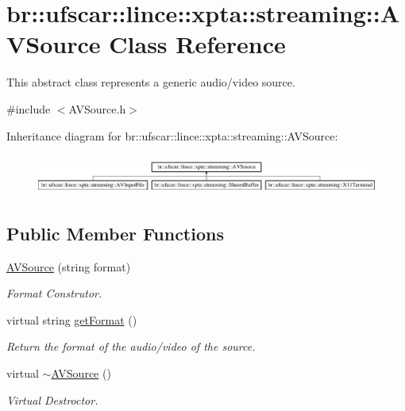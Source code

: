 \hypertarget{classbr_1_1ufscar_1_1lince_1_1xpta_1_1streaming_1_1AVSource}{
\section{br::ufscar::lince::xpta::streaming::AVSource Class Reference}
\label{classbr_1_1ufscar_1_1lince_1_1xpta_1_1streaming_1_1AVSource}
}


This abstract class represents a generic audio/video source.  




{\ttfamily \#include $<$AVSource.h$>$}

Inheritance diagram for br::ufscar::lince::xpta::streaming::AVSource:\begin{figure}[H]
\begin{center}
\leavevmode
\includegraphics[height=1.34293cm]{classbr_1_1ufscar_1_1lince_1_1xpta_1_1streaming_1_1AVSource}
\end{center}
\end{figure}
\subsection*{Public Member Functions}
\begin{DoxyCompactItemize}
\item 
\hyperlink{classbr_1_1ufscar_1_1lince_1_1xpta_1_1streaming_1_1AVSource_ac07cc6f087efe58f2b723910c0718db4}{AVSource} (string format)
\begin{DoxyCompactList}\small\item\em Format Construtor. \item\end{DoxyCompactList}\item 
virtual string \hyperlink{classbr_1_1ufscar_1_1lince_1_1xpta_1_1streaming_1_1AVSource_af48c984168363d2f473f8468b1abdece}{getFormat} ()
\begin{DoxyCompactList}\small\item\em Return the format of the audio/video of the source. \item\end{DoxyCompactList}\item 
virtual \hyperlink{classbr_1_1ufscar_1_1lince_1_1xpta_1_1streaming_1_1AVSource_a1cd42bb6d2f38b872963320ed457a034}{$\sim$AVSource} ()
\begin{DoxyCompactList}\small\item\em Virtual Destroctor. \item\end{DoxyCompactList}\end{DoxyCompactItemize}
